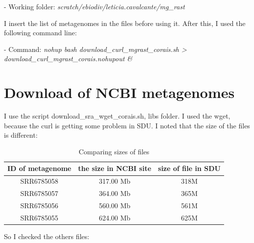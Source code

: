 \documentclass[12pt, a4paper]{report}
\begin{document}
\begin{tcolorbox}[width=6.3in]
 \scriptsize 
 - Working folder: \textit{scratch/ebiodiv/leticia.cavalcante/mg\_rast}
 \end{tcolorbox}

I insert the list of metagenomes in the files before using it. After this, I used the following command line:

\begin{tcolorbox}[width=6.3in]
 \scriptsize 
 - Command: \textit{nohup bash download\_curl\_mgrast\_corais.sh > download\_curl\_mgrast\_corais.nohupout \&}
 \end{tcolorbox}

\section{Download of NCBI metagenomes}
I use the script download\_sra\_wget\_corais.sh, libs folder. I used the wget, because the curl is getting some problem in SDU.
I noted that the size of the files is different:


\begin{table}[!htb]
  \caption{Comparing sizes of files}
  \centering
  \begin{tabular}{ccc}
  \hline 
       ID of metagenome&the size in NCBI site&size of file in SDU\\
  \hline
	SRR6785058&317.00 Mb&318M\\
	SRR6785057&364.00 Mb&365M\\
	SRR6785056&560.00 Mb&561M\\
	SRR6785055&624.00 Mb&625M\\
  \hline
  \end{tabular}
  \label{table2}
 \end{table}

So I checked the others files:
\end{document}
